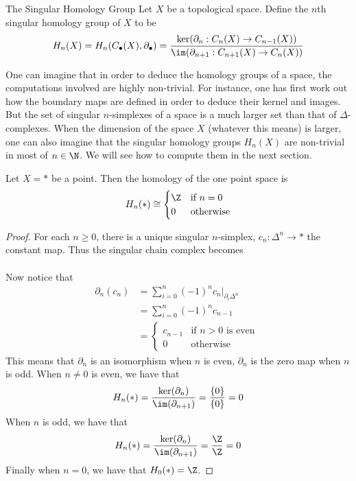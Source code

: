 \documentclass[a4paper]{article}
\begin{document}
\begin{defn}{The Singular Homology Group}{} Let $X$ be a topological space. Define the $n$th singular homology group of $X$ to be $$H_n(X)=H_n(C_\bullet(X),\partial_\bullet)=\frac{\ker(\partial_n:C_n(X)\to C_{n-1}(X))}{\im(\partial_{n+1}:C_{n+1}(X)\to C_n(X))}$$
\end{defn}

One can imagine that in order to deduce the homology groups of a space, the computations involved are highly non-trivial. For instance, one has first work out how the boundary maps are defined in order to deduce their kernel and images. But the set of singular $n$-simplexes of a space is a much larger set than that of $\Delta$-complexes. When the dimension of the space $X$ (whatever this means) is larger, one can also imagine that the singular homology groups $H_n(X)$ are non-trivial in most of $n\in\N$. We will see how to compute them in the next section. 

\begin{eg}{}{} Let $X=\ast$ be a point. Then the homology of the one point space is $$H_n(\ast)\cong\begin{cases}
\Z & \text{if } n=0\\
0 & \text{otherwise}
\end{cases}$$ 
\begin{proof}
For each $n\geq 0$, there is a unique singular $n$-simplex, $c_n:\Delta^n\to\ast$ the constant map. Thus the singular chain complex becomes \\
\\
Now notice that 
\begin{align*}
\partial_n(c_n)&=\sum_{i=0}^n(-1)^nc_n|_{\partial_i\Delta^n}\\
&=\sum_{i=0}^n(-1)^nc_{n-1}\\
&=\begin{cases}
c_{n-1} & \text{if } n>0\text{ is even }\\
0 & \text{otherwise }
\end{cases}
\end{align*}
This means that $\partial_n$ is an isomorphism when $n$ is even, $\partial_n$ is the zero map when $n$ is odd. When $n\neq 0$ is even, we have that $$H_n(\ast)=\frac{\ker(\partial_n)}{\im(\partial_{n+1})}=\frac{\{0\}}{\{0\}}=0$$ When $n$ is odd, we have that $$H_n(\ast)=\frac{\ker(\partial_n)}{\im(\partial_{n+1})}=\frac{\Z}{\Z}=0$$ Finally when $n=0$, we have that $H_0(\ast)=\Z$. 
\end{proof}
\end{eg}
\end{document}
